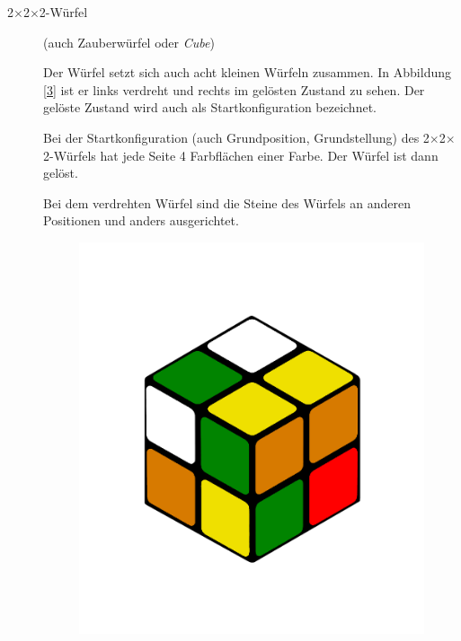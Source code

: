 \documentclass[12pt,a4paper, usenames, dvipsnames]{article}
\newcommand{\Ttwo}{2$\times$2$\times$2-}
\begin{document}
\begin{description}



\item[\Ttwo Würfel] (auch Zauberwürfel oder \textit{Cube}) 

Der Würfel setzt sich auch acht kleinen Würfeln zusammen.
In Abbildung \ref{3} ist er links verdreht und rechts im gelösten Zustand zu sehen. Der gelöste Zustand wird auch als Startkonfiguration bezeichnet.

Bei der Startkonfiguration (auch Grundposition, Grundstellung) des \Ttwo Würfels hat jede Seite 4 Farbflächen einer Farbe. Der Würfel ist dann gelöst.  

Bei dem verdrehten Würfel sind die Steine des Würfels an anderen Positionen und anders ausgerichtet.
\begin{figure}[h]
\centering
\includegraphics[scale=0.1]{2x2scrambled.png}

\end{figure}
\end{description}
\end{document}
